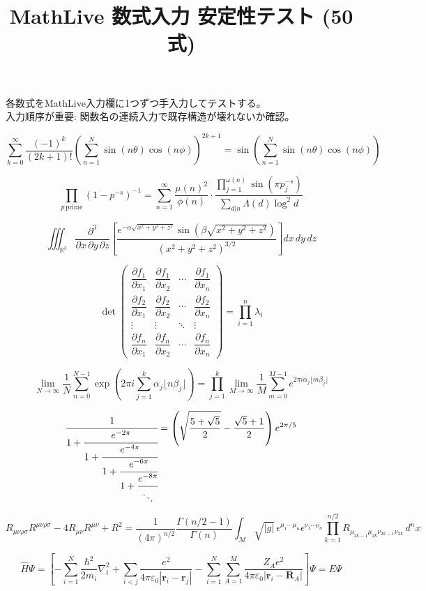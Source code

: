 \documentclass[a4paper,9pt]{article}
\title{MathLive 数式入力 安定性テスト (50式)}
\author{}
\date{}
\begin{document}
\maketitle
\noindent 各数式をMathLive入力欄に1つずつ手入力してテストする。\\
入力順序が重要: 関数名の連続入力で既存構造が壊れないか確認。

\[
\sum_{k=0}^{\infty}\frac{(-1)^k}{(2k+1)!}\left(\sum_{n=1}^{N}\sin(n\theta)\cos(n\phi)\right)^{2k+1} = \sin\!\left(\sum_{n=1}^{N}\sin(n\theta)\cos(n\phi)\right)
\]

\[
\prod_{p\,\text{prime}}\left(1-p^{-s}\right)^{-1} = \sum_{n=1}^{\infty}\frac{\mu(n)^2}{\phi(n)}\cdot\frac{\prod_{j=1}^{\omega(n)}\sin(\pi p_j^{-s})}{\sum_{d|n}\Lambda(d)\log^2 d}
\]

\[
\iiint_{\mathbb{R}^3}\frac{\partial^3}{\partial x\,\partial y\,\partial z}\left[\frac{e^{-\alpha\sqrt{x^2+y^2+z^2}}\sin(\beta\sqrt{x^2+y^2+z^2})}{\left(x^2+y^2+z^2\right)^{3/2}}\right]dx\,dy\,dz
\]

\[
\det\begin{pmatrix}\dfrac{\partial f_1}{\partial x_1} & \dfrac{\partial f_1}{\partial x_2} & \cdots & \dfrac{\partial f_1}{\partial x_n}\\ \dfrac{\partial f_2}{\partial x_1} & \dfrac{\partial f_2}{\partial x_2} & \cdots & \dfrac{\partial f_2}{\partial x_n}\\ \vdots & \vdots & \ddots & \vdots\\ \dfrac{\partial f_n}{\partial x_1} & \dfrac{\partial f_n}{\partial x_2} & \cdots & \dfrac{\partial f_n}{\partial x_n}\end{pmatrix} = \prod_{i=1}^{n}\lambda_i
\]

\[
\lim_{N\to\infty}\frac{1}{N}\sum_{n=0}^{N-1}\exp\!\left(2\pi i\sum_{j=1}^{k}\alpha_j\lfloor n\beta_j\rfloor\right) = \prod_{j=1}^{k}\lim_{M\to\infty}\frac{1}{M}\sum_{m=0}^{M-1}e^{2\pi i\alpha_j\lfloor m\beta_j\rfloor}
\]

\[
\cfrac{1}{1+\cfrac{e^{-2\pi}}{1+\cfrac{e^{-4\pi}}{1+\cfrac{e^{-6\pi}}{1+\cfrac{e^{-8\pi}}{\ddots}}}}} = \left(\sqrt{\frac{5+\sqrt{5}}{2}}-\frac{\sqrt{5}+1}{2}\right)e^{2\pi/5}
\]

\[
R_{\mu\nu\rho\sigma}R^{\mu\nu\rho\sigma} - 4R_{\mu\nu}R^{\mu\nu} + R^2 = \frac{1}{(4\pi)^{n/2}}\frac{\Gamma(n/2-1)}{\Gamma(n)}\int_{\mathcal{M}}\sqrt{|g|}\,\epsilon^{\mu_1\cdots\mu_n}\epsilon^{\nu_1\cdots\nu_n}\prod_{k=1}^{n/2}R_{\mu_{2k-1}\mu_{2k}\nu_{2k-1}\nu_{2k}}\,d^n x
\]

\[
\hat{H}\Psi = \left[-\sum_{i=1}^{N}\frac{\hbar^2}{2m_i}\nabla_i^2 + \sum_{i<j}\frac{e^2}{4\pi\varepsilon_0|\mathbf{r}_i-\mathbf{r}_j|} - \sum_{i=1}^{N}\sum_{A=1}^{M}\frac{Z_A e^2}{4\pi\varepsilon_0|\mathbf{r}_i-\mathbf{R}_A|}\right]\Psi = E\Psi
\]
\end{document}
